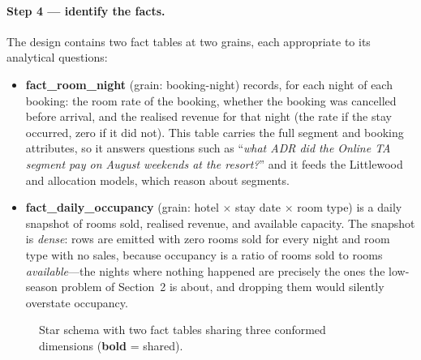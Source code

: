 \paragraph{Step 4 --- identify the facts.}
The design contains two fact tables at two grains, each appropriate to its analytical questions:

\begin{itemize}
  \item \textbf{fact\_room\_night} (grain: booking-night) records, for each night of each booking: the room rate of the booking, whether the booking was cancelled before arrival, and the realised revenue for that night (the rate if the stay occurred, zero if it did not). This table carries the full segment and booking attributes, so it answers questions such as ``\emph{what ADR did the Online TA segment pay on August weekends at the resort?}'' and it feeds the Littlewood and allocation models, which reason about segments.
  \item \textbf{fact\_daily\_occupancy} (grain: hotel $\times$ stay date $\times$ room type) is a daily snapshot of rooms sold, realised revenue, and available capacity. The snapshot is \emph{dense}: rows are emitted with zero rooms sold for every night and room type with no sales, because occupancy is a ratio of rooms sold to rooms \emph{available}---the nights where nothing happened are precisely the ones the low-season problem of Section~2 is about, and dropping them would silently overstate occupancy.
\end{itemize}

\begin{figure}[H]
\centering
{}
\caption{Star schema with two fact tables sharing three conformed dimensions (\textbf{bold} = shared).}
\label{fig:starschema}
\end{figure}

